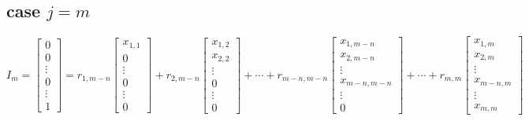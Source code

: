\documentclass[a4paper,12pt]{article}
\begin{document}
\subsection{case $j=m$ }

\begin{equation}
I_{m} =\begin{bmatrix}
           0 \\
           0 \\
           \vdots \\
           0 \\
           \vdots \\
           1
         \end{bmatrix}=r_{1,m-n} \begin{bmatrix}
           x_{1,1} \\
           0 \\
           \vdots \\
           0 \\
           \vdots \\
           0
         \end{bmatrix} + r_{2,m-n} \begin{bmatrix}
           x_{1,2} \\
           x_{2,2} \\
           \vdots \\
           0 \\
           \vdots \\
           0
           \end{bmatrix} + \cdots + r_{m-n,m-n}\begin{bmatrix}
           x_{1,m-n} \\
           x_{2,m-n} \\
           \vdots \\
           x_{m-n,m-n} \\
           \vdots \\
           0
           \end{bmatrix} + \cdots + r_{m,m}\begin{bmatrix}
           x_{1,m} \\
           x_{2,m} \\
           \vdots \\
           x_{m-n,m} \\
           \vdots \\
           x_{m,m}
           \end{bmatrix} 
\end{equation}
\end{document}
